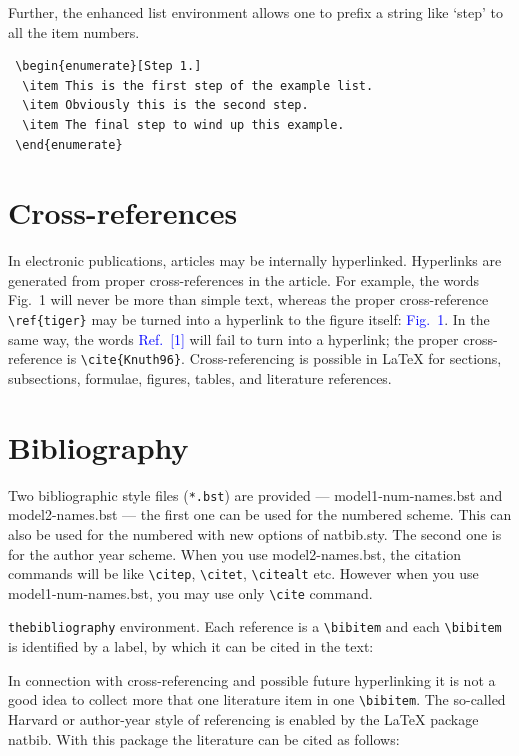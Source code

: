 \documentclass[a4paper,fleqn]{cas-sc}
\begin{document}
Further, the enhanced list environment allows one to prefix a
string like `step' to all the item numbers.  

\begin{verbatim}
 \begin{enumerate}[Step 1.]
  \item This is the first step of the example list.
  \item Obviously this is the second step.
  \item The final step to wind up this example.
 \end{enumerate}
\end{verbatim}

\section{Cross-references}
In electronic publications, articles may be internally
hyperlinked. Hyperlinks are generated from proper
cross-references in the article.  For example, the words
\textcolor{black!80}{Fig.~1} will never be more than simple text,
whereas the proper cross-reference \verb+\ref{tiger}+ may be
turned into a hyperlink to the figure itself:
\textcolor{blue}{Fig.~1}.  In the same way,
the words \textcolor{blue}{Ref.~[1]} will fail to turn into a
hyperlink; the proper cross-reference is \verb+\cite{Knuth96}+.
Cross-referencing is possible in \LaTeX{} for sections,
subsections, formulae, figures, tables, and literature
references.

\section{Bibliography}

Two bibliographic style files (\verb+*.bst+) are provided ---
{model1-num-names.bst} and {model2-names.bst} --- the first one can be
used for the numbered scheme. This can also be used for the numbered
with new options of {natbib.sty}. The second one is for the author year
scheme. When  you use model2-names.bst, the citation commands will be
like \verb+\citep+,  \verb+\citet+, \verb+\citealt+ etc. However when
you use model1-num-names.bst, you may use only \verb+\cite+ command.

\verb+thebibliography+ environment.  Each reference is a
\verb+\bibitem+ and each \verb+\bibitem+ is identified by a label,
by which it can be cited in the text:

\noindent In connection with cross-referencing and
possible future hyperlinking it is not a good idea to collect
more that one literature item in one \verb+\bibitem+.  The
so-called Harvard or author-year style of referencing is enabled
by the \LaTeX{} package {natbib}. With this package the
literature can be cited as follows:
\end{document}
